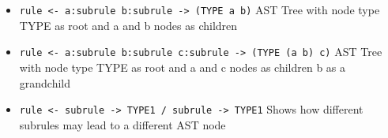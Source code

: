 \begin{itemize}
\item \texttt{rule \textless{}- a:subrule b:subrule -\textgreater{} (TYPE a b)} AST Tree with node type TYPE as root and a and b nodes as children

\item \texttt{rule \textless{}- a:subrule b:subrule c:subrule -\textgreater{} (TYPE (a b) c)} AST Tree with node type TYPE as root and a and c nodes as children b as a grandchild

\item \texttt{rule \textless{}- subrule -\textgreater{} TYPE1 / subrule -\textgreater{} TYPE1} Shows how different subrules may lead to a different AST node

\end{itemize}

